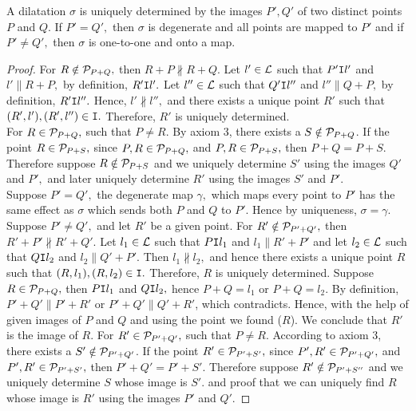 \begin{theorem}
    A dilatation $\sigma$ is uniquely determined by the images $P', Q'$ of two distinct points $P$ and $Q$. If $P'=Q',$ then $\sigma$ is degenerate and all points are mapped to $P'$ and if $P' \neq Q',$ then $\sigma$ is one-to-one and onto a map.
\end{theorem}
\begin{proof}
    For $R \notin \mathcal{P}_{P+Q},$ then $R+P \nparallel R+Q.$ Let $l' \in \mathcal{L}$ such that $P' \texttt{I} l'$ and $l' \parallel R+P,$ by definition, $R' \texttt{I} l'.$ Let $l'' \in \mathcal{L}$ such that $Q' \texttt{I} l''$ and $l'' \parallel Q+P,$ by definition, $R' \texttt{I} l''.$ Hence, $l' \nparallel l'',$ and there exists a unique point $R'$ such that $(R',l'),(R',l'') \in \texttt{I}.$ Therefore, $R'$ is uniquely determined. \\
    For $R \in \mathcal{P}_{P+Q},$ such that $P \neq R.$ By axiom 3, there exists a $S \notin \mathcal{P}_{P+Q}$. If the point $R \in \mathcal{P}_{P+S},$ since $P,R \in \mathcal{P}_{P+Q},$ and $P,R \in \mathcal{P}_{P+S},$ then $P+Q=P+S.$ Therefore suppose $R \notin \mathcal{P}_{P+S}$ and we uniquely determine $S'$ using the images $Q'$ and $P',$ and later uniquely determine $R'$ using the images $S'$ and $P'.$ \\
    Suppose $P' = Q',$ the degenerate map $\gamma,$ which maps every point to $P'$ has the same effect as $\sigma$ which sends both $P$ and $Q$ to $P'$. Hence by uniqueness, $\sigma = \gamma.$ \\
    Suppose $P' \neq Q',$ and let $R'$ be a given point. For $R' \notin \mathcal{P}_{P'+Q'},$ then $R'+P' \nparallel R'+Q'.$ Let $l_1 \in \mathcal{L}$ such that $P \texttt{I} l_1$ and $l_1 \parallel R'+P'$ and let $l_2 \in \mathcal{L}$ such that $Q \texttt{I} l_2$ and $l_2 \parallel Q'+P'.$ Then $l_1 \nparallel l_2,$ and hence there exists a unique point $R$ such that $(R,l_1),(R,l_2) \in \texttt{I}.$ Therefore, $R$ is uniquely determined.  Suppose $R \in \mathcal{P}_{P+Q},$ then $P \texttt{I} l_1$ and $Q \texttt{I} l_2,$ hence $P+Q = l_1$ or $P+Q = l_2.$ By definition, $P'+Q' \parallel P' + R'$ or $P'+Q' \parallel Q' + R'$, which contradicts. Hence, with the help of given images of $P$ and $Q$ and using the point we found ($R$). We conclude that $R'$ is the image of $R.$ For $R' \in \mathcal{P}_{P'+Q'},$ such that $P \neq R.$ According to axiom 3, there exists a $S' \notin \mathcal{P}_{P'+Q'}$. If the point $R' \in \mathcal{P}_{P'+S'},$ since $P',R' \in \mathcal{P}_{P'+Q'},$ and $P',R' \in \mathcal{P}_{P'+S'},$ then $P'+Q'=P'+S'.$ Therefore suppose $R' \notin \mathcal{P}_{P'+S''}$ and we uniquely determine $S$ whose image is $S'.$ and proof that we can uniquely find $R$ whose image is $R'$ using the images $P'$ and $Q'.$
\end{proof}

